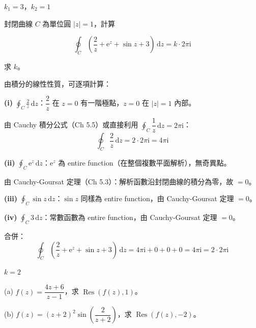 \documentclass[12pt,a4paper]{article}
\newcommand{\dd}{\,\mathrm{d}}
\newcommand{\ii}{\mathrm{i}}
\newcommand{\ee}{\mathrm{e}}
\newcommand{\Res}{\operatorname{Res}}
\begin{document}
\begin{ansbox}
$k_1=\boxed{3}$，$k_2=\boxed{1}$
\end{ansbox}

\begin{qbox}[第 13 題]
封閉曲線 $C$ 為單位圓 $|z|=1$，計算

$$\oint_C\left(\frac{2}{z}+\ee^z+\sin z+3\right)\dd{z}=k\cdot 2\pi\ii$$

求 $k$。
\end{qbox}

\begin{solbox}[解]
由積分的線性性質，可逐項計算：

\textbf{(i)} $\displaystyle\oint_C\frac{2}{z}\dd{z}$：$\dfrac{2}{z}$ 在 $z=0$ 有一階極點，$z=0$ 在 $|z|=1$ 內部。

由 Cauchy 積分公式（Ch 5.5）或直接利用 $\oint_C\dfrac{1}{z}\dd{z}=2\pi\ii$：
$$\oint_C\frac{2}{z}\dd{z}=2\cdot 2\pi\ii=4\pi\ii$$

\textbf{(ii)} $\displaystyle\oint_C\ee^z\dd{z}$：$\ee^z$ 為 entire function（在整個複數平面解析），無奇異點。

由 Cauchy-Goursat 定理（Ch 5.3）：解析函數沿封閉曲線的積分為零，故 $=0$。

\textbf{(iii)} $\displaystyle\oint_C\sin z\dd{z}$：$\sin z$ 同樣為 entire function，由 Cauchy-Goursat 定理 $=0$。

\textbf{(iv)} $\displaystyle\oint_C 3\dd{z}$：常數函數為 entire function，由 Cauchy-Goursat 定理 $=0$。

合併：
$$\oint_C\left(\frac{2}{z}+\ee^z+\sin z+3\right)\dd{z}=4\pi\ii+0+0+0=4\pi\ii=2\cdot 2\pi\ii$$
\end{solbox}

\begin{ansbox}
$k=\boxed{2}$
\end{ansbox}

\begin{qbox}[第 14 題]
(a) $f(z)=\dfrac{4z+6}{z-1}$，求 $\Res(f(z),1)$。

(b) $f(z)=(z+2)^2\sin\!\left(\dfrac{2}{z+2}\right)$，求 $\Res(f(z),-2)$。
\end{qbox}
\end{document}
